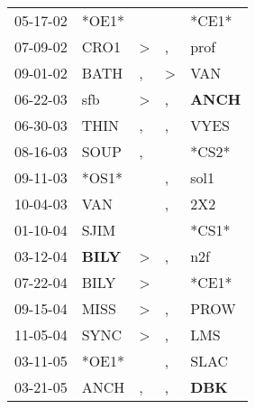 \begin{supertabular}{p{0.07\textwidth}p{0.06\textwidth}p{0.02\textwidth}p{0.02\textwidth}p{0.06\textwidth}}
 05-17-02\textsuperscript{} &                            *OE1* &                  &                  &                            *CE1* \\
 07-09-02\textsuperscript{} &           CRO1\textsuperscript{} &     \textgreater &                , &           prof\textsuperscript{} \\
 09-01-02\textsuperscript{} &           BATH\textsuperscript{} &                , &     \textgreater &            VAN\textsuperscript{} \\
 06-22-03\textsuperscript{} &            sfb\textsuperscript{} &     \textgreater &                , &  \textbf{ANCH\textsuperscript{}} \\
 06-30-03\textsuperscript{} &           THIN\textsuperscript{} &                , &                , &           VYES\textsuperscript{} \\
 08-16-03\textsuperscript{} &           SOUP\textsuperscript{} &                , &                  &                            *CS2* \\
 09-11-03\textsuperscript{} &                            *OS1* &                  &                , &           sol1\textsuperscript{} \\
 10-04-03\textsuperscript{} &            VAN\textsuperscript{} &                  &                , &            2X2\textsuperscript{} \\
 01-10-04\textsuperscript{} &           SJIM\textsuperscript{} &                  &                  &                            *CS1* \\
 03-12-04\textsuperscript{} &  \textbf{BILY\textsuperscript{}} &     \textgreater &                , &            n2f\textsuperscript{} \\
 07-22-04\textsuperscript{} &           BILY\textsuperscript{} &     \textgreater &                  &                            *CE1* \\
 09-15-04\textsuperscript{} &           MISS\textsuperscript{} &     \textgreater &                , &           PROW\textsuperscript{} \\
 11-05-04\textsuperscript{} &           SYNC\textsuperscript{} &     \textgreater &                , &            LMS\textsuperscript{} \\
 03-11-05\textsuperscript{} &                            *OE1* &                  &                , &           SLAC\textsuperscript{} \\
 03-21-05\textsuperscript{} &           ANCH\textsuperscript{} &                , &                , &   \textbf{DBK\textsuperscript{}} \\

\end{supertabular}
